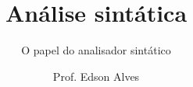 \title{Análise sintática}
\subtitle{O papel do analisador sintático}
\date{}
\author{Prof. Edson Alves}
